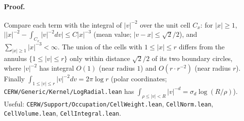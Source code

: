\paragraph{Proof.} Compare each term with the integral of $|v|^{-2}$ over the unit cell $C_x$:
for $|x|\ge1$, $\bigl||x|^{-2}-\int_{C_x}|v|^{-2}dv\bigr|\le C|x|^{-3}$ (mean value; $|v-x|\le\sqrt2/2$), and
$\sum_{|x|\ge1}|x|^{-3}<\infty$. The union of the cells with $1\le|x|\le r$ differs from the annulus
$\{1\le|v|\le r\}$ only within distance $\sqrt2/2$ of its two boundary circles, where $|v|^{-2}$ has
integral $O(1)$ (near radius $1$) and $O(r\cdot r^{-2})$ (near radius $r$). Finally
$\int_{1\le|v|\le r}|v|^{-2}dv=2\pi\log r$ (polar coordinates; \texttt{CERW/Generic/Kernel/LogRadial.lean}
has $\int_{\rho\le|v|<R}|v|^{-d}=\sigma_d\log(R/\rho)$). Useful: \texttt{CERW/Support/Occupation/CellWeight.lean},
\texttt{CellNorm.lean}, \texttt{CellVolume.lean}, \texttt{CellIntegral.lean}.
